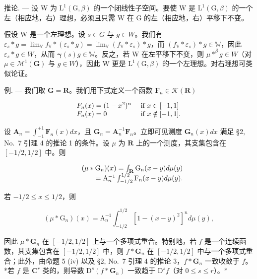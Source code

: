 推论. --- 设 W 为 \(\mathrm{L}^{1}(\mathrm{G},\beta)\) 的一个闭线性子空间。要使 W 是 \(\mathrm{L}^{1}(\mathrm{G},\beta)\) 的一个左（相应地，右）理想，必须且只需 W 在 G 的左（相应地，右）平移下不变。

假设 W 是一个左理想。设 \(s \in G\) 与 \(g \in W\)。我们有 \(\varepsilon_{s} * g = \lim_{\mathbb{V}} f_{\mathbb{V}} * (\varepsilon_{s} * g) = \lim_{\mathbb{V}} (f_{\mathbb{V}} * \varepsilon_{s}) * g\)，而 \((f_{\mathbb{V}} * \varepsilon_{s}) * g \in \mathbb{W}\)，因此 \(\varepsilon_{s} * g \in W\)，从而 \(\boldsymbol{\gamma}(s)g \in \mathbb{W}\)。反之，若 W 在左平移下不变，则 \(\mu *^{\beta}g \in W\)（对 \(\mu \in \mathcal{M}^{1}(\mathbf{G})\) 与 \(g \in W\)），因此 W 更是 \(\mathrm{L}^{1}(\mathrm{G}, \beta)\) 的一个左理想。对右理想可类似论证。

例. --- 我们取 \(\mathbf{G} = \mathbf{R}\)。我们用下式定义一个函数 \(\mathbf{F}_n \in \mathcal{K}(\mathbf{R})\)

\[
\begin{array}{l l} F _ {n} (x) = (1 - x ^ {2}) ^ {n} & \text { if } x \in [ - 1, 1 ] \\ F _ {n} (x) = 0 & \text { if } x \notin [ - 1, 1 ]. \end{array}
\]

设 \(\mathbf{A}_n = \int_{-1}^{+1}\mathbf{F}_n(x)dx\)，且 \(\mathbf{G}_n = \mathbf{A}_n^{-1}\mathbf{F}_n\)。立即可见测度 \(\mathbf{G}_n(x)dx\) 满足 §2, No.~7 引理 4 的推论 1 的条件。设 \(\mu\) 为 \(\mathbf{R}\) 上的一个测度，其支集包含在 \([-1/2, 1/2]\) 中。则

\[
\begin{array}{r l} & {(\mu * \mathrm{G} _ {n}) (x) = \int_ {\mathbf {R}} \mathrm{G} _ {n} (x - y) d \mu (y)} \\ & {\qquad = \mathrm{A} _ {n} ^ {- 1} \int_ {- 1 / 2} ^ {1 / 2} \mathrm{F} _ {n} (x - y) d \mu (y).} \end{array}
\]

若 \(-1 / 2\leqslant x\leqslant 1 / 2\)，则

\[
(\mu * \mathrm{G} _ {n}) (x) = \mathrm{A} _ {n} ^ {- 1} \int_ {- 1 / 2} ^ {1 / 2} [ 1 - (x - y) ^ {2} ] ^ {n} d \mu (y),
\]

因此 \(\mu * \mathbf{G}_n\) 在 \([-1/2, 1/2]\) 上与一个多项式重合。特别地，若 \(f\) 是一个连续函数，其支集包含在 \([-1/2, 1/2]\) 中，则 \(f * \mathbf{G}_n\) 在 \([-1/2, 1/2]\) 中与一个多项式重合；此外，由命题 5 (iv) 以及 §2, No.~7 引理 4 的推论 3，\(f * \mathbf{G}_n\) 一致收敛于 \(f\)。*若 \(f\) 是 \(\mathbf{C}^r\) 类的，则导数 \(\mathrm{D}^s(f * \mathbf{G}_n)\) 一致趋于 \(\mathrm{D}^s f\)（对 \(0 \leqslant s \leqslant r\)）。*


